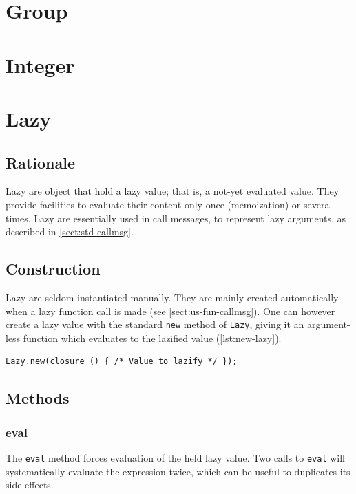\documentclass[openright,twoside,12pt]{report}
\newcommand   {\floatpos}          {htbp}
\newcommand{\lst}[1]{\autoref{lst:#1}}
\newcommand{\sect}[1]{\autoref{sect:#1}}
\begin{document}
\section{Group}
\section{Integer}
\section{Lazy}

\subsection{Rationale}

Lazy are object that hold a lazy value; that is, a not-yet evaluated
value. They provide facilities to evaluate their content only once
(memoization) or several times. Lazy are essentially used in call
messages, to represent lazy arguments, as described in
\sect{std-callmsg}.

\subsection{Construction}

Lazy are seldom instantiated manually. They are mainly created
automatically when a lazy function call is made (see
\sect{us-fun-callmsg}). One can however create a lazy value with the
standard \lstinline|new| method of \lstinline|Lazy|, giving it an
argument-less function which evaluates to the lazified value
(\lst{new-lazy}).

\begin{lstlisting}[caption=Creating a lazy value, label=lst:new-lazy,
  float=\floatpos]
  Lazy.new(closure () { /* Value to lazify */ });
\end{lstlisting}

\subsection{Methods}
\subsubsection{eval}

The \lstinline|eval| method forces evaluation of the held lazy
value. Two calls to \lstinline|eval| will systematically evaluate the
expression twice, which can be useful to duplicates its side effects.
\end{document}
